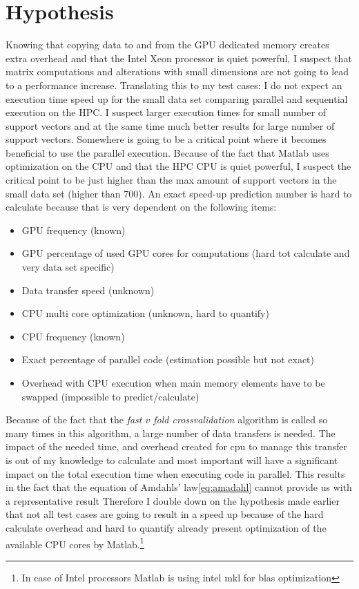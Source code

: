 \section{Hypothesis}
Knowing that copying data to and from the GPU dedicated memory creates extra overhead and that the Intel Xeon processor is quiet powerful, I suspect that matrix computations and alterations with small dimensions are not going to lead to a performance increase.
Translating this to my test cases: I do not expect an execution time speed up for the small data set comparing parallel and sequential execution on the HPC.
I suspect larger execution times for small number of support vectors and at the same time much better results for large number of support vectors.
Somewhere is going to be a critical point where it becomes beneficial to use the parallel execution.
Because of the fact that Matlab uses optimization on the CPU and that the HPC CPU is quiet powerful, I suspect the critical point to be just higher than the max amount of support vectors in the small data set (higher than 700). 
An exact speed-up prediction number is hard to calculate because that is very dependent on the following items:
\begin{itemize}
	\item GPU frequency (known)
	\item GPU percentage of used GPU cores for computations (hard tot calculate and very data set specific)
	\item Data transfer speed (unknown)
	\item CPU multi core optimization (unknown, hard to quantify) 
	\item CPU frequency (known)
	\item Exact percentage of parallel code (estimation possible but not exact)
	\item Overhead with CPU execution when main memory elements have to be swapped (impossible to predict/calculate)
\end{itemize}
Because of the fact that the \textit{fast $v$ fold crossvalidation} algorithm is called so many times in this algorithm, a large number of data transfers is needed.
The impact of the needed time, and overhead created for cpu to manage this transfer is out of my knowledge to calculate and most important will have a significant impact on the total execution time when executing code in parallel.
This results in the fact that the equation of Amdahls' law\ref{eq:amadahl} cannot provide us with a representative result
Therefore I double down on the hypothesis made earlier that not all test cases are going to result in a speed up because of the hard calculate overhead and hard to quantify already present optimization of the available CPU cores by Matlab.\footnote{In case of Intel processors Matlab is using intel mkl for blas optimization}
